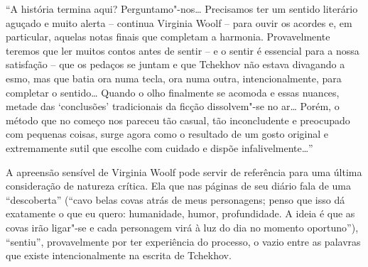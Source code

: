 ``A história termina aqui? Perguntamo"-nos\ldots{} Precisamos ter um sentido
literário aguçado e muito alerta -- continua Virginia Woolf -- para
ouvir os acordes e, em particular, aquelas notas finais que completam a
harmonia. Provavelmente teremos que ler muitos contos antes de sentir --
e o sentir é essencial para a nossa satisfação -- que os pedaços se
juntam e que Tchekhov não estava divagando a esmo, mas que batia ora
numa tecla, ora numa outra, intencionalmente, para completar o
sentido\ldots{} Quando o olho finalmente se acomoda e essas nuances, metade
das `conclusões' tradicionais da ficção dissolvem"-se no ar\ldots{} Porém, o
método que no começo nos pareceu tão casual, tão inconcludente e
preocupado com pequenas coisas, surge agora como o resultado de um gosto
original e extremamente sutil que escolhe com cuidado e dispõe
infalivelmente\ldots{}''

A apreensão sensível de Virginia Woolf pode servir de referência para
uma última consideração de natureza crítica. Ela que nas páginas de seu
diário fala de uma ``descoberta'' (``cavo belas covas atrás de meus
personagens; penso que isso dá exatamente o que eu quero: humanidade,
humor, profundidade. A ideia é que as covas irão ligar"-se e cada
personagem virá à luz do dia no momento oportuno''), ``sentiu'',
provavelmente por ter experiência do processo, o vazio entre as palavras
que existe intencionalmente na escrita de Tchekhov.

